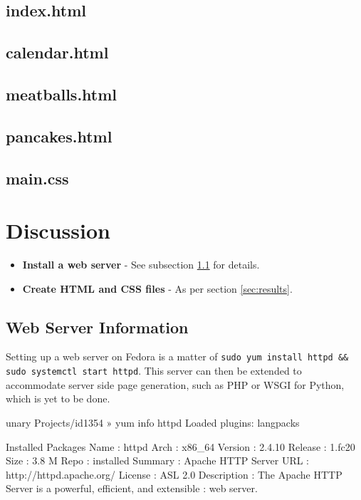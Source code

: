 \documentclass[a4paper]{scrartcl}
\begin{document}
\subsection{index.html}


\subsection{calendar.html}


\subsection{meatballs.html}


\subsection{pancakes.html}


\subsection{main.css}


\section{Discussion}

\begin{itemize}
\item \textbf{Install a web server} - See subsection \ref{subsec:httpd} for details.
\item \textbf{Create HTML and CSS files} - As per section \ref{sec:results}.
\end{itemize}

\subsection{Web Server Information}
\label{subsec:httpd}

Setting up a web server on Fedora is a matter of \texttt{sudo yum install httpd && sudo systemctl start httpd}. This server can then be extended to accommodate server side page generation, such as PHP or WSGI for Python, which is yet to be done.

\begin{lstlistings}
unary Projects/id1354 » yum info httpd                                                                                                       
Loaded plugins: langpacks

Installed Packages
Name        : httpd
Arch        : x86_64
Version     : 2.4.10
Release     : 1.fc20
Size        : 3.8 M
Repo        : installed
Summary     : Apache HTTP Server
URL         : http://httpd.apache.org/
License     : ASL 2.0
Description : The Apache HTTP Server is a powerful, efficient, and extensible
            : web server.
\end{lstlistings}
\end{document}
